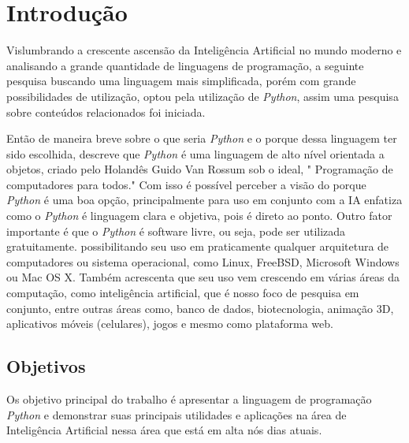 \chapter*{Introdução}
Vislumbrando a crescente ascensão da Inteligência Artificial no mundo moderno e analisando a grande quantidade de linguagens de programação, a seguinte pesquisa buscando uma linguagem mais simplificada, porém com grande possibilidades de utilização, optou pela utilização de \textit{Python}, assim uma pesquisa sobre conteúdos relacionados foi iniciada.

Então de maneira breve sobre o que seria \textit{Python} e o porque dessa linguagem ter sido escolhida, \cite{pythonbasico2024} descreve que \textit{Python} é uma linguagem de alto nível orientada a objetos, criado pelo Holandês Guido Van Rossum sob o ideal, " Programação de computadores para todos." Com isso é possível perceber a visão do porque \textit{Python} é uma boa opção, principalmente para uso em conjunto com a IA \cite{menezes2010introduccao} enfatiza como o \textit{Python} é linguagem clara e objetiva, pois é direto ao ponto. Outro fator importante é que o \textit{Python} é software livre, ou seja, pode ser utilizada gratuitamente. possibilitando seu uso em praticamente qualquer arquitetura de computadores ou sistema operacional, como Linux, FreeBSD, Microsoft Windows ou Mac OS X.
Também acrescenta que seu uso vem crescendo em várias áreas da computação, como inteligência artificial, que é nosso foco de pesquisa em conjunto, entre outras áreas como, banco de dados, biotecnologia, animação 3D, aplicativos móveis (celulares), jogos e mesmo como plataforma web.


\newpage
\section{Objetivos}
Os objetivo principal do trabalho é apresentar a linguagem de programação \textit{Python} e demonstrar suas principais utilidades e aplicações na área de Inteligência Artificial nessa área que está em alta nós dias atuais.

